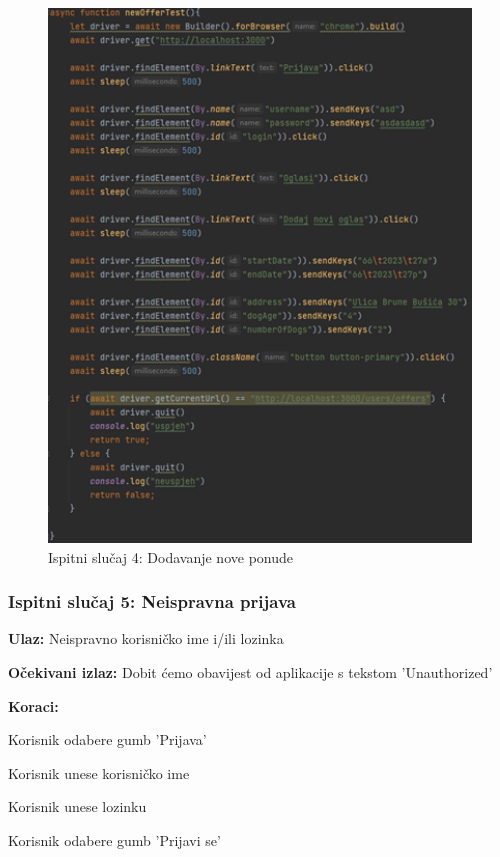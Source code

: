  			\begin{figure}[H]
 				\centering
 				\includegraphics[width=12cm]{slike/dodavanjeNovePonude}
 				\caption{Ispitni slučaj 4: Dodavanje nove ponude}
 				\label{fig:Ispitni-slucaj-4}
 			\end{figure}
 		
 			\subsubsection{Ispitni slučaj 5: Neispravna prijava}
 			
 			\begin{packed_item}
 				
 				\item \textbf{Ulaz: } Neispravno korisničko ime i/ili lozinka
 				\item  \textbf{Očekivani izlaz:} Dobit ćemo obavijest od aplikacije s tekstom 'Unauthorized'
 				\item  \textbf{Koraci:}
 				
 				\item[] \begin{packed_enum}
 					
 					\item Korisnik odabere gumb 'Prijava'
 					\item Korisnik unese korisničko ime
 					\item Korisnik unese lozinku
 					\item Korisnik odabere gumb 'Prijavi se'
 					
 				\end{packed_enum}
 			\end{packed_item}
 			
